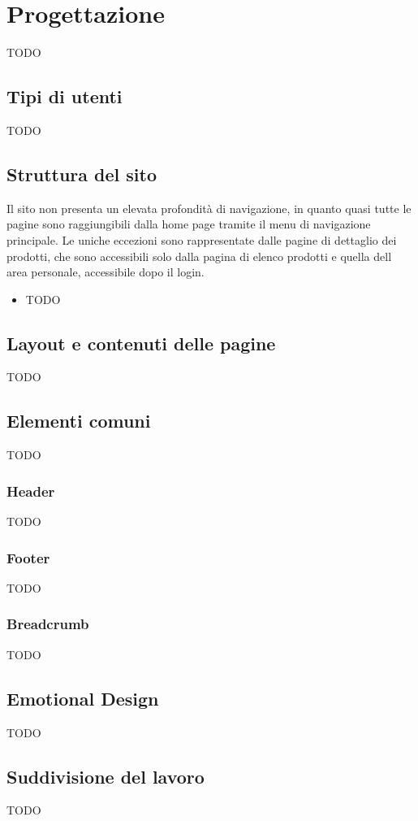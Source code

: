 \section{Progettazione}

TODO

\subsection{Tipi di utenti}

TODO

\subsection{Struttura del sito}

Il sito non presenta un elevata profondità di navigazione, in quanto quasi tutte le pagine sono raggiungibili dalla home page tramite il menu di navigazione principale. Le uniche eccezioni sono rappresentate dalle pagine di dettaglio dei prodotti, che sono accessibili solo dalla pagina di elenco prodotti e quella dell area personale, accessibile dopo il login.

\begin{itemize}
    \item TODO
\end{itemize}

\subsection{Layout e contenuti delle pagine}

TODO

\subsection{Elementi comuni}

TODO

\subsubsection{Header}

TODO

\subsubsection{Footer}

TODO

\subsubsection{Breadcrumb}

TODO

\subsection{Emotional Design}

TODO

\subsection{Suddivisione del lavoro}

TODO
